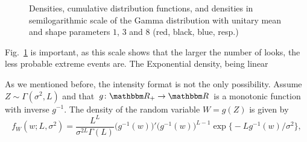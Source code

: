 \documentclass{beamer}
\begin{document}
\begin{frame}[allowframebreaks]
\begin{figure}[hbt]
\centering
{}
\caption[Densities, cumulative distribution functions, and densities in semilogarithmic scale of the Gamma distribution with unitary mean and shape parameters $1$, $3$ and $8$]{Densities, cumulative distribution functions, and densities in semilogarithmic scale of the Gamma distribution with unitary mean and shape parameters $1$, $3$ and $8$ (red, black, blue, resp.)}\label{Fig:GammaDistribution}
\end{figure}


Fig.~\ref{Fig:GammaDistribution} is important, as this scale shows that the larger the number of looks, the less probable extreme events are.
The Exponential density, being linear

As we mentioned before, the intensity format is not the only possibility.
Assume $Z\sim\Gamma(\sigma^2,L)$ and that $g\colon\mathbbm R_+ \to \mathbbm R$ is a monotonic function with inverse $g^{-1}$.
The density of the random variable $W = g(Z)$ is given by 
\begin{equation}
f_W(w;L,\sigma^2) = \frac{L^L}{\sigma^{2L}\Gamma(L)} (g^{-1}(w)\big)' \big(g^{-1}(w)\big)^{L-1} 
	\exp\big\{ -L g^{-1}(w) / \sigma^2
	\big\},
	\label{eq:GammmaTransformed}
\end{equation}


\end{frame}
\end{document}
